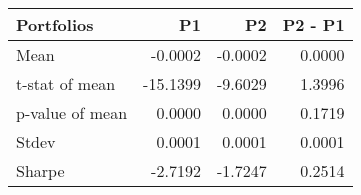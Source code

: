 \begin{tabular}{lrrr}
\toprule
Portfolios & P1 & P2 & P2 - P1 \\
\midrule
Mean & -0.0002 & -0.0002 & 0.0000 \\
t-stat of mean & -15.1399 & -9.6029 & 1.3996 \\
p-value of mean & 0.0000 & 0.0000 & 0.1719 \\
Stdev & 0.0001 & 0.0001 & 0.0001 \\
Sharpe & -2.7192 & -1.7247 & 0.2514 \\
\bottomrule
\end{tabular}
